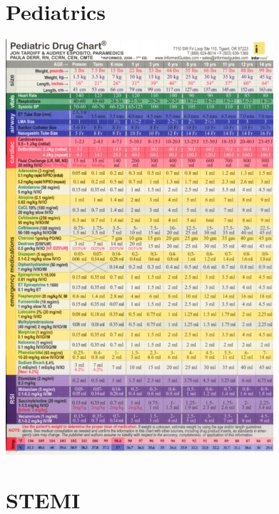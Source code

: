 \documentclass[8pt]{extarticle}
\begin{document}
\section{Pediatrics}

\includegraphics[width=\textwidth]{peddrug.jpg}

\section{STEMI}
\end{document}
